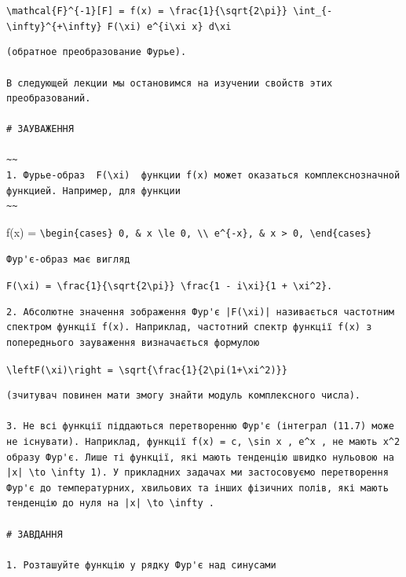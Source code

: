 \documentclass[
  ukrainian,
]{article}
\begin{document}
\texttt{\textbackslash{}mathcal\{F\}\^{}\{-1\}{[}F{]}\ =\ f(x)\ =\ \textbackslash{}frac\{1\}\{\textbackslash{}sqrt\{2\textbackslash{}pi\}\}\ \textbackslash{}int\_\{-\textbackslash{}infty\}\^{}\{+\textbackslash{}infty\}\ F(\textbackslash{}xi)\ e\^{}\{i\textbackslash{}xi\ x\}\ d\textbackslash{}xi}

\begin{verbatim}
(обратное преобразование Фурье).

В следующей лекции мы остановимся на изучении свойств этих преобразований.

# ЗАУВАЖЕННЯ

~~
1. Фурье-образ  F(\xi)  функции f(x) может оказаться комплекснозначной функцией. Например, для функции
~~
\end{verbatim}

f(x) =
\texttt{\textbackslash{}begin\{cases\}\ 0,\ \&\ x\ \textbackslash{}le\ 0,\ \textbackslash{}\textbackslash{}\ e\^{}\{-x\},\ \&\ x\ \textgreater{}\ 0,\ \textbackslash{}end\{cases\}}

\begin{verbatim}
Фур'є-образ має вигляд
\end{verbatim}

\texttt{F(\textbackslash{}xi)\ =\ \textbackslash{}frac\{1\}\{\textbackslash{}sqrt\{2\textbackslash{}pi\}\}\ \textbackslash{}frac\{1\ -\ i\textbackslash{}xi\}\{1\ +\ \textbackslash{}xi\^{}2\}.}

\begin{verbatim}
2. Абсолютне значення зображення Фур'є |F(\xi)| називається частотним спектром функції f(x). Наприклад, частотний спектр функції f(x) з попереднього зауваження визначається формулою
\end{verbatim}

\texttt{\textbackslash{}left\textbar{}F(\textbackslash{}xi)\textbackslash{}right\textbar{}\ =\ \textbackslash{}sqrt\{\textbackslash{}frac\{1\}\{2\textbackslash{}pi(1+\textbackslash{}xi\^{}2)\}\}}

\begin{verbatim}
(зчитувач повинен мати змогу знайти модуль комплексного числа).

3. Не всі функції піддаються перетворенню Фур'є (інтеграл (11.7) може не існувати). Наприклад, функції f(x) = c, \sin x , e^x , не мають x^2 образу Фур'є. Лише ті функції, які мають тенденцію швидко нульовою на |x| \to \infty 1). У прикладних задачах ми застосовуємо перетворення Фур'є до температурних, хвильових та інших фізичних полів, які мають тенденцію до нуля на |x| \to \infty .

# ЗАВДАННЯ

1. Розташуйте функцію у рядку Фур'є над синусами
\end{verbatim}
\end{document}
